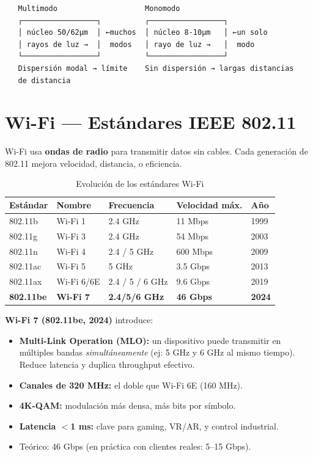 \begin{lstlisting}
   Multimodo                    Monomodo
   ┌─────────────────┐          ┌─────────────────┐
   │ núcleo 50/62µm  │ ←muchos  │ núcleo 8-10µm   │ ←un solo
   │ rayos de luz →  │  modos   │ rayo de luz →   │  modo
   └─────────────────┘          └─────────────────┘
   Dispersión modal → límite    Sin dispersión → largas distancias
   de distancia
\end{lstlisting}

\section{ Wi-Fi --- Estándares IEEE 802.11}

\begin{concepto}
Wi-Fi usa \textbf{ondas de radio} para transmitir datos sin cables.
Cada generación de 802.11 mejora velocidad, distancia, o eficiencia.
\end{concepto}

\begin{table}[h!]
\centering
\renewcommand{\arraystretch}{1.4}
\begin{tabular}{lllll}
\toprule
\textbf{Estándar} & \textbf{Nombre} & \textbf{Frecuencia} & \textbf{Velocidad máx.} & \textbf{Año} \\
\midrule
802.11b  & Wi-Fi 1  & 2.4 GHz           & 11 Mbps   & 1999 \\
802.11g  & Wi-Fi 3  & 2.4 GHz           & 54 Mbps   & 2003 \\
802.11n  & Wi-Fi 4  & 2.4 / 5 GHz       & 600 Mbps  & 2009 \\
802.11ac & Wi-Fi 5  & 5 GHz             & 3.5 Gbps  & 2013 \\
802.11ax & Wi-Fi 6/6E & 2.4 / 5 / 6 GHz & 9.6 Gbps  & 2019 \\
\textbf{802.11be} & \textbf{Wi-Fi 7} & \textbf{2.4/5/6 GHz} & \textbf{46 Gbps} & \textbf{2024} \\
\bottomrule
\end{tabular}
\caption{Evolución de los estándares Wi-Fi}
\end{table}

\begin{moderno}
\textbf{ Wi-Fi 7 (802.11be, 2024)} introduce:
\begin{itemize}
    \item \textbf{Multi-Link Operation (MLO):} un dispositivo puede transmitir
          en múltiples bandas \textit{simultáneamente} (ej: 5 GHz y 6 GHz al mismo
          tiempo). Reduce latencia y duplica throughput efectivo.
    \item \textbf{Canales de 320 MHz:} el doble que Wi-Fi 6E (160 MHz).
    \item \textbf{4K-QAM:} modulación más densa, más bits por símbolo.
    \item \textbf{Latencia $<$1 ms:} clave para gaming, VR/AR, y control industrial.
    \item Teórico: 46 Gbps (en práctica con clientes reales: 5--15 Gbps).
\end{itemize}
\end{moderno}

